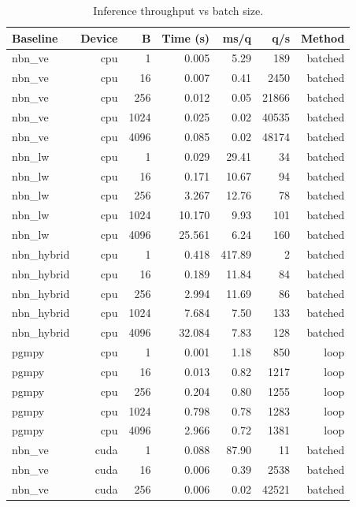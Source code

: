 \begin{table}[h]
  \centering
  \caption{Inference throughput vs batch size.}
  \label{tab:nbn-crash-inference}
  \begin{tabular}{lrrrrrr}
    \toprule
    Baseline & Device & B & Time (s) & ms/q & q/s & Method \\
    \midrule
    nbn\_ve & cpu & 1 & 0.005 & 5.29 & 189 & batched \\
    nbn\_ve & cpu & 16 & 0.007 & 0.41 & 2450 & batched \\
    nbn\_ve & cpu & 256 & 0.012 & 0.05 & 21866 & batched \\
    nbn\_ve & cpu & 1024 & 0.025 & 0.02 & 40535 & batched \\
    nbn\_ve & cpu & 4096 & 0.085 & 0.02 & 48174 & batched \\
    nbn\_lw & cpu & 1 & 0.029 & 29.41 & 34 & batched \\
    nbn\_lw & cpu & 16 & 0.171 & 10.67 & 94 & batched \\
    nbn\_lw & cpu & 256 & 3.267 & 12.76 & 78 & batched \\
    nbn\_lw & cpu & 1024 & 10.170 & 9.93 & 101 & batched \\
    nbn\_lw & cpu & 4096 & 25.561 & 6.24 & 160 & batched \\
    nbn\_hybrid & cpu & 1 & 0.418 & 417.89 & 2 & batched \\
    nbn\_hybrid & cpu & 16 & 0.189 & 11.84 & 84 & batched \\
    nbn\_hybrid & cpu & 256 & 2.994 & 11.69 & 86 & batched \\
    nbn\_hybrid & cpu & 1024 & 7.684 & 7.50 & 133 & batched \\
    nbn\_hybrid & cpu & 4096 & 32.084 & 7.83 & 128 & batched \\
    pgmpy & cpu & 1 & 0.001 & 1.18 & 850 & loop \\
    pgmpy & cpu & 16 & 0.013 & 0.82 & 1217 & loop \\
    pgmpy & cpu & 256 & 0.204 & 0.80 & 1255 & loop \\
    pgmpy & cpu & 1024 & 0.798 & 0.78 & 1283 & loop \\
    pgmpy & cpu & 4096 & 2.966 & 0.72 & 1381 & loop \\
    nbn\_ve & cuda & 1 & 0.088 & 87.90 & 11 & batched \\
    nbn\_ve & cuda & 16 & 0.006 & 0.39 & 2538 & batched \\
    nbn\_ve & cuda & 256 & 0.006 & 0.02 & 42521 & batched \\

\end{tabular}
\end{table}
